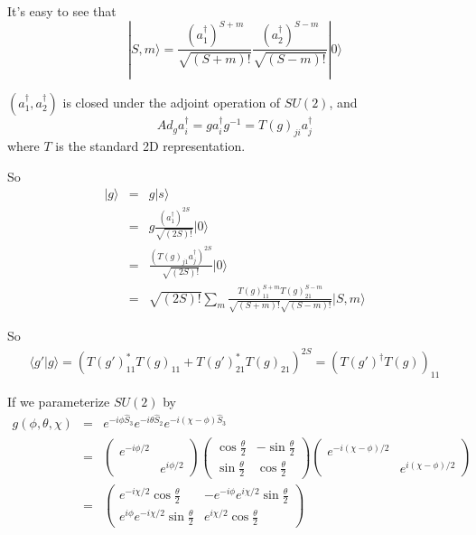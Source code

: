 \documentclass[12pt]{book}
\begin{document}
	It's easy to see that 
	\begin{equation}
		|S,m\rangle=\frac{(a_1^\dagger)^{S+m}}{\sqrt{(S+m)!}}\frac{(a_2^\dagger)^{S-m}}{\sqrt{(S-m)!}}|0\rangle
	\end{equation}
	
	$(a_1^\dagger,a_2^\dagger)$ is closed under the adjoint operation of $SU(2)$, and
	\begin{equation}
		Ad_g a_i^\dagger=ga_i^\dagger g^{-1}=T(g)_{ji}a_j^\dagger
	\end{equation}
	where $T$ is the standard 2D representation.
	
	So 
	\begin{eqnarray}
		|g\rangle&=&g|s\rangle\\
		&=&g\frac{(a_1^\dagger)^{2S}}{\sqrt{(2S)!}}|0\rangle\\
		&=&\frac{(T(g)_{j1}a_j^\dagger)^{2S}}{\sqrt{(2S)!}}|0\rangle\\
		&=&\sqrt{(2S)!}\sum_m\frac{T(g)_{11}^{S+m}T(g)_{21}^{S-m}}{\sqrt{(S+m)!}\sqrt{(S-m)!}}|S,m\rangle
	\end{eqnarray} 
	
	So
	\begin{eqnarray}
		\langle g'|g\rangle=(T(g')_{11}^*T(g)_{11}+T(g')_{21}^*T(g)_{21})^{2S}=(T(g')^\dagger T(g))_{11}
	\end{eqnarray}
	
	If we parameterize $SU(2)$ by
	\begin{eqnarray}
		g(\phi,\theta,\chi)&=&e^{-i\phi\hat S_3}e^{-i\theta\hat S_2}e^{-i(\chi-\phi)\hat S_3}\\
		&=&
		\begin{pmatrix}
			e^{-i\phi/2}&\\
			&e^{i\phi/2}
		\end{pmatrix}
		\begin{pmatrix}
			\cos\frac \theta 2&-\sin\frac \theta 2\\
			\sin\frac \theta 2&\cos\frac \theta 2
		\end{pmatrix}
		\begin{pmatrix}
			e^{-i(\chi-\phi)/2}&\\
			&e^{i(\chi-\phi)/2}
		\end{pmatrix}\\
		&=&
		\begin{pmatrix}
			e^{-i\chi/2}\cos\frac \theta 2&-e^{-i\phi}e^{i\chi/2}\sin\frac \theta 2\\
			e^{i\phi}e^{-i\chi/2}\sin\frac \theta 2&e^{i\chi/2}\cos\frac \theta 2
		\end{pmatrix}
	\end{eqnarray}
	
\end{document}

